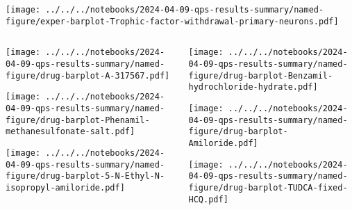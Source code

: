 \documentclass[aspectratio=169]{beamer}
\begin{document}
\begin{frame}
  \texttt{[image: ../../../notebooks/2024-04-09-qps-results-summary/named-figure/exper-barplot-Trophic-factor-withdrawal-primary-neurons.pdf]}
\end{frame}
\begin{frame}
\begin{columns}[t]
\begin{column}{0.5\textwidth}

  \texttt{[image: ../../../notebooks/2024-04-09-qps-results-summary/named-figure/drug-barplot-A-317567.pdf]}

  \texttt{[image: ../../../notebooks/2024-04-09-qps-results-summary/named-figure/drug-barplot-Phenamil-methanesulfonate-salt.pdf]}

  \texttt{[image: ../../../notebooks/2024-04-09-qps-results-summary/named-figure/drug-barplot-5-N-Ethyl-N-isopropyl-amiloride.pdf]}
\end{column}

\begin{column}{0.5\textwidth}

  \texttt{[image: ../../../notebooks/2024-04-09-qps-results-summary/named-figure/drug-barplot-Benzamil-hydrochloride-hydrate.pdf]}

  \texttt{[image: ../../../notebooks/2024-04-09-qps-results-summary/named-figure/drug-barplot-Amiloride.pdf]}

  \texttt{[image: ../../../notebooks/2024-04-09-qps-results-summary/named-figure/drug-barplot-TUDCA-fixed-HCQ.pdf]}

\end{column}
\end{columns}
\end{frame}
\end{document}
